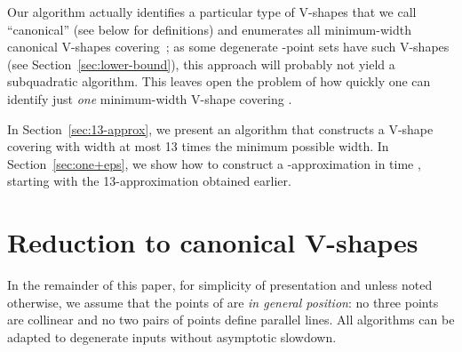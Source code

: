 \documentclass{llncs}
\begin{document}
Our algorithm actually identifies a particular type of V-shapes that
we call ``canonical'' (see below for definitions) and enumerates all
minimum-width canonical V-shapes covering~; as some degenerate
-point sets have  such V-shapes (see Section~\ref{sec:lower-bound}), this approach will probably not yield
a subquadratic algorithm.  This leaves open the problem of how quickly
one can identify just \emph{one} minimum-width V-shape covering .

In Section~\ref{sec:13-approx}, we present an  algorithm
that constructs a V-shape covering  with width at most 13 times the
minimum possible width.  In Section~\ref{sec:one+eps}, we show how to
construct a -approximation in time , starting with the 13-approximation
obtained earlier.

\section{Reduction to canonical V-shapes}
\label{sec:canonical}

In the remainder of this paper, for simplicity of presentation and 
unless noted otherwise, we assume
that the points of  are \emph{in general position}: no three points are
collinear and no two pairs of points define parallel lines. 
All algorithms can be adapted to degenerate inputs without asymptotic slowdown.
\end{document}
